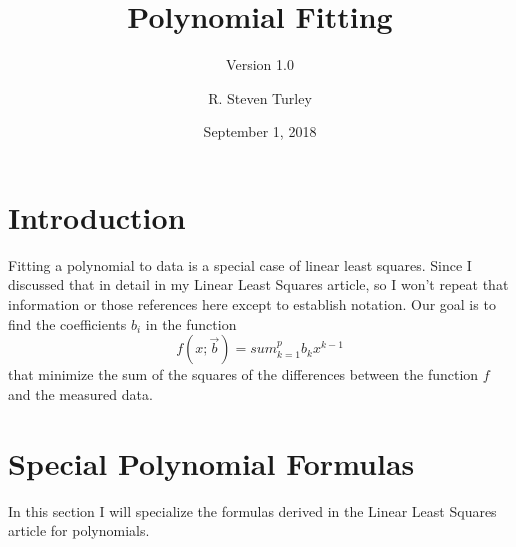 \documentclass{scrartcl}
\title{Polynomial Fitting}
\subtitle{Version 1.0}
\author{R. Steven Turley}
\date{September 1, 2018}
\begin{document}
\maketitle
\tableofcontents

\section{Introduction}
Fitting a polynomial to data is a special case of linear least
squares. Since I discussed that in detail in my Linear Least
Squares article\cite{linLS}, so I won't repeat that information
or those references here except to establish notation. Our goal
is to find the coefficients $b_i$ in the function
\begin{equation}
f(x;\vec{b}) = sum_{k=1}^p b_k x^{k-1}
\end{equation}
that minimize the sum of the squares of the differences between
the function $f$ and the measured data.

\section{Special Polynomial Formulas}
In this section I will specialize the formulas derived in
the Linear Least Squares article\cite{linLS} for polynomials.
\end{document}
